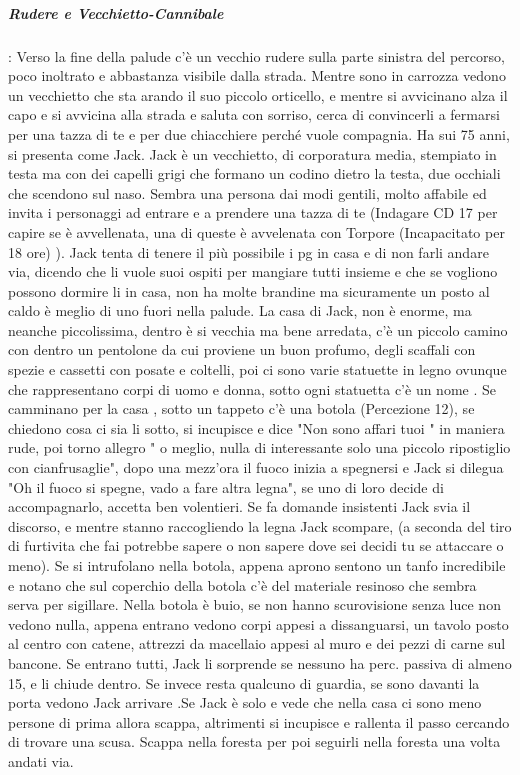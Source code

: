 \documentclass{article}
\begin{document}
                        \subparagraph{Rudere e Vecchietto-Cannibale}: Verso la fine della palude c'è un vecchio rudere sulla parte sinistra del percorso, poco inoltrato e abbastanza visibile dalla strada. Mentre sono in carrozza vedono un vecchietto che sta arando il suo piccolo orticello, e mentre si avvicinano alza il capo e si avvicina alla strada e saluta con sorriso, 
cerca di convincerli a fermarsi per una tazza di te e per due chiacchiere perché vuole compagnia. 
 Ha sui 75 anni, si presenta come Jack. Jack è un vecchietto, di corporatura media, stempiato in testa ma con dei capelli grigi che formano un codino dietro la testa, 
 due occhiali che scendono sul naso. Sembra una persona dai modi gentili, molto affabile ed invita i personaggi ad entrare e a prendere una tazza di te
  (Indagare CD 17 per capire se è avvellenata, una di queste è avvelenata con Torpore (Incapacitato per 18 ore) ). Jack tenta di tenere il più possibile i pg in casa e di non farli andare via,
   dicendo che li vuole suoi ospiti per mangiare tutti insieme e che se vogliono possono dormire li in casa, non ha molte brandine ma sicuramente un posto al caldo è meglio di uno fuori nella palude.
La casa di Jack, non è enorme, ma neanche piccolissima, dentro è si vecchia ma bene arredata, 
c'è un piccolo camino con dentro un pentolone da cui proviene un buon profumo, degli scaffali con spezie e cassetti con posate e coltelli,
 poi ci sono varie statuette in legno ovunque che rappresentano corpi di uomo e donna, sotto ogni statuetta c'è un nome . 
 Se camminano per la casa , sotto un tappeto c'è una botola (Percezione 12), se chiedono cosa ci sia li sotto, si incupisce e dice "Non sono affari tuoi " in maniera rude, poi torno allegro " o meglio, nulla di interessante solo una piccolo ripostiglio con cianfrusaglie", dopo una mezz'ora il fuoco inizia a spegnersi e Jack si dilegua "Oh il fuoco si spegne, vado a fare altra legna", se uno di loro decide di accompagnarlo, accetta ben volentieri. Se fa domande insistenti Jack svia il discorso, e mentre stanno raccogliendo la legna Jack scompare, (a seconda del tiro di furtivita che fai potrebbe sapere o non sapere dove sei decidi tu se attaccare o meno). 
 Se si intrufolano nella botola, appena aprono sentono un tanfo incredibile e notano che sul coperchio della botola c'è del materiale resinoso che sembra serva per sigillare. Nella botola è buio, se non hanno scurovisione senza luce non vedono nulla, appena entrano vedono corpi appesi a dissanguarsi, un tavolo posto al centro con catene, attrezzi da macellaio appesi al muro e dei pezzi di carne sul bancone.
  Se entrano tutti, Jack li sorprende se nessuno ha perc. passiva di almeno 15, e li chiude dentro. Se invece resta qualcuno di guardia, se sono davanti la porta vedono Jack arrivare .Se Jack è solo e vede che nella casa ci sono meno persone di prima allora scappa, altrimenti si incupisce e rallenta il passo cercando di trovare una scusa. Scappa nella foresta per poi seguirli nella foresta una volta andati via.   
   
\end{document}
